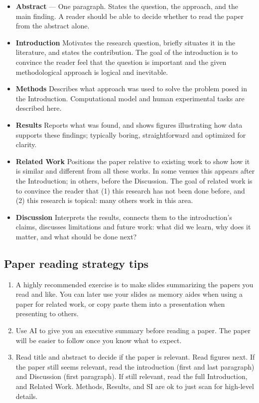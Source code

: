 \documentclass[11pt, letterpaper]{article}
\begin{document}
\begin{itemize}
\item \textbf{Abstract} --- One paragraph. States the question, 
      the approach, and the main finding. A reader should be able to decide whether to read the paper from the abstract alone. 
    \item \textbf{Introduction}  Motivates the research question,  briefly situates it in the literature, and states the contribution. The goal of the introduction is to convince the reader feel that the question is important and the given methodological approach is logical and inevitable.
    \item \textbf{Methods} Describes what approach was used to solve the problem posed in the Introduction. Computational model and human experimental tasks are described here. 
    \item \textbf{Results} Reports what was found, and shows figures illustrating how data supports these findings; typically boring, straightforward and optimized for clarity.
    \item \textbf{Related Work} Positions the paper relative to 
      existing work to show how it is similar and different from all these works. In some venues this appears after the 
      Introduction; in others, before the Discussion. The goal of related work is to convince the reader that (1) this research has not been done before, and (2) this research is topical: many others work in this area.
    \item \textbf{Discussion} Interprets the results, connects 
      them to the introduction's claims, discusses 
      limitations and future work: what did we learn, why does it matter, and what should be done next?
\end{itemize}

\subsection{Paper reading strategy tips}

\begin{enumerate}
\item A highly recommended exercise is to make slides summarizing the papers you read and like. You can later use your slides as memory aides when using a paper for related work, or copy paste them into a presentation when presenting to others. 
\item Use AI to give you an executive summary before reading a paper. The paper will be easier to follow once you know what to expect.
\item Read title and abstract to decide if the paper is relevant. Read figures next. If the paper still seems relevant, read the introduction (first and last paragraph) and Discussion (first paragraph). If still relevant, read the full Introduction, and Related Work. Methods, Results, and SI are ok to just scan for high-level details.
\end{enumerate}
\end{document}
